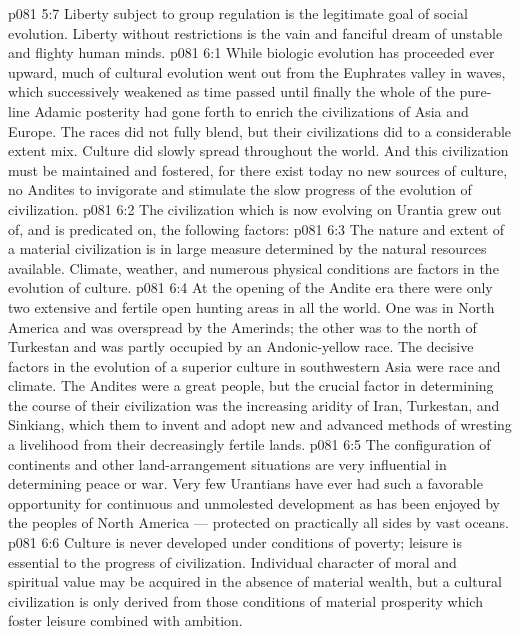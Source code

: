 \vs p081 5:7 Liberty subject to group regulation is the legitimate goal of social evolution. Liberty without restrictions is the vain and fanciful dream of unstable and flighty human minds.
\vs p081 6:1 While biologic evolution has proceeded ever upward, much of cultural evolution went out from the Euphrates valley in waves, which successively weakened as time passed until finally the whole of the pure\hyp{}line Adamic posterity had gone forth to enrich the civilizations of Asia and Europe. The races did not fully blend, but their civilizations did to a considerable extent mix. Culture did slowly spread throughout the world. And this civilization must be maintained and fostered, for there exist today no new sources of culture, no Andites to invigorate and stimulate the slow progress of the evolution of civilization.
\vs p081 6:2 \pc The civilization which is now evolving on Urantia grew out of, and is predicated on, the following factors:
\vs p081 6:3 \bibnobreakspace {} The nature and extent of a material civilization is in large measure determined by the natural resources available. Climate, weather, and numerous physical conditions are factors in the evolution of culture.
\vs p081 6:4 At the opening of the Andite era there were only two extensive and fertile open hunting areas in all the world. One was in North America and was overspread by the Amerinds; the other was to the north of Turkestan and was partly occupied by an Andonic\hyp{}yellow race. The decisive factors in the evolution of a superior culture in southwestern Asia were race and climate. The Andites were a great people, but the crucial factor in determining the course of their civilization was the increasing aridity of Iran, Turkestan, and Sinkiang, which  them to invent and adopt new and advanced methods of wresting a livelihood from their decreasingly fertile lands.
\vs p081 6:5 The configuration of continents and other land\hyp{}arrangement situations are very influential in determining peace or war. Very few Urantians have ever had such a favorable opportunity for continuous and unmolested development as has been enjoyed by the peoples of North America --- protected on practically all sides by vast oceans.
\vs p081 6:6 \pc {}\bibnobreakspace {} Culture is never developed under conditions of poverty; leisure is essential to the progress of civilization. Individual character of moral and spiritual value may be acquired in the absence of material wealth, but a cultural civilization is only derived from those conditions of material prosperity which foster leisure combined with ambition.
